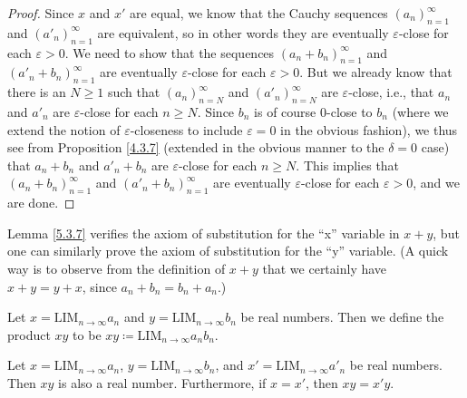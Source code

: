 \begin{proof}
    Since \(x\) and \(x'\) are equal, we know that the Cauchy sequences \((a_n)_{n = 1}^{\infty}\) and \((a'_n)_{n = 1}^{\infty}\) are equivalent, so in other words they are eventually \(\varepsilon\)-close for each \(\varepsilon > 0\).
    We need to show that the sequences \((a_n + b_n)_{n = 1}^{\infty}\) and \((a'_n + b_n)_{n = 1}^{\infty}\) are eventually \(\varepsilon\)-close for each \(\varepsilon > 0\).
    But we already know that there is an \(N \geq 1\) such that \((a_n)_{n = N}^{\infty}\) and \((a'_n)_{n = N}^{\infty}\) are \(\varepsilon\)-close, i.e., that \(a_n\) and \(a'_n\) are \(\varepsilon\)-close for each \(n \geq N\).
    Since \(b_n\) is of course \(0\)-close to \(b_n\) (where we extend the notion of \(\varepsilon\)-closeness to include \(\varepsilon = 0\) in the obvious fashion), we thus see from Proposition \ref{4.3.7} (extended in the obvious manner to the \(\delta = 0\) case) that \(a_n + b_n\) and \(a'_n + b_n\) are \(\varepsilon\)-close for each \(n \geq N\).
    This implies that \((a_n + b_n)_{n = 1}^{\infty}\) and \((a'_n + b_n)_{n = 1}^{\infty}\) are eventually \(\varepsilon\)-close for each \(\varepsilon > 0\), and we are done.
\end{proof}

\begin{remark}\label{5.3.8}
    Lemma \ref{5.3.7} verifies the axiom of substitution for the ``x'' variable in \(x + y\), but one can similarly prove the axiom of substitution for the ``y'' variable.
    (A quick way is to observe from the definition of \(x + y\) that we certainly have \(x + y = y + x\), since \(a_n + b_n = b_n + a_n\).)
\end{remark}

\begin{definition}\label{5.3.9}
    Let \(x = \text{LIM}_{n \to \infty} a_n\) and \(y = \text{LIM}_{n \to \infty} b_n\) be real numbers.
    Then we define the product \(xy\) to be \(xy \coloneqq \text{LIM}_{n \to \infty} a_n b_n\).
\end{definition}

\begin{proposition}\label{5.3.10}
    Let \(x = \text{LIM}_{n \to \infty} a_n\), \(y = \text{LIM}_{n \to \infty} b_n\), and \(x' = \text{LIM}_{n \to \infty} a'_n\) be real numbers.
    Then \(xy\) is also a real number.
    Furthermore, if \(x = x'\), then \(xy = x'y\).
\end{proposition}

